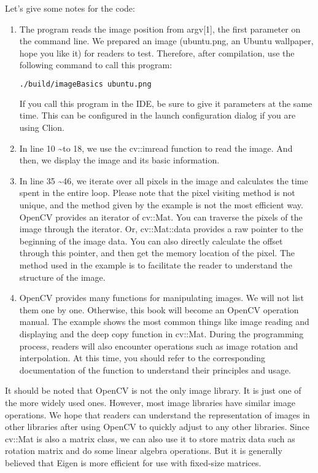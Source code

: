 Let's give some notes for the code:
\begin{enumerate}
\item The program reads the image position from argv[1], the first parameter on the command line. We prepared an image (ubuntu.png, an Ubuntu wallpaper, hope you like it) for readers to test. Therefore, after compilation, use the following command to call this program:
\begin{lstlisting}[language=sh, caption=Terminal input:]
./build/imageBasics ubuntu.png
\end{lstlisting}
If you call this program in the IDE, be sure to give it parameters at the same time. This can be configured in the launch configuration dialog if you are using Clion.
\item In line 10 \textasciitilde to 18, we use the cv::imread function to read the image. And then, we display the image and its basic information.
\item In line 35 \textasciitilde 46, we iterate over all pixels in the image and calculates the time spent in the entire loop. Please note that the pixel visiting method is not unique, and the method given by the example is not the most efficient way. OpenCV provides an iterator of cv::Mat. You can traverse the pixels of the image through the iterator. Or, cv::Mat::data provides a raw pointer to the beginning of the image data. You can also directly calculate the offset through this pointer, and then get the memory location of the pixel. The method used in the example is to facilitate the reader to understand the structure of the image.

\item OpenCV provides many functions for manipulating images. We will not list them one by one. Otherwise, this book will become an OpenCV operation manual. The example shows the most common things like image reading and displaying and the deep copy function in cv::Mat. During the programming process, readers will also encounter operations such as image rotation and interpolation. At this time, you should refer to the corresponding documentation of the function to understand their principles and usage.
\end{enumerate}

It should be noted that OpenCV is not the only image library. It is just one of the more widely used ones. However, most image libraries have similar image operations. We hope that readers can understand the representation of images in other libraries after using OpenCV to quickly adjust to any other libraries. Since cv::Mat is also a matrix class, we can also use it to store matrix data such as rotation matrix and do some linear algebra operations. But it is generally believed that Eigen is more efficient for use with fixed-size matrices.

